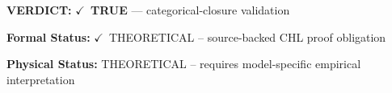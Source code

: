 \textbf{VERDICT:} \ensuremath{\checkmark}\ \textbf{TRUE} --- categorical-closure validation

\textbf{Formal Status:} \ensuremath{\checkmark}\ THEORETICAL -- source-backed CHL proof obligation

\textbf{Physical Status:} THEORETICAL -- requires model-specific empirical interpretation
\par\vspace{0.45em}
\par
\ifTZPDarkEdition
{}
\fi
\endgroup
\endgroup
